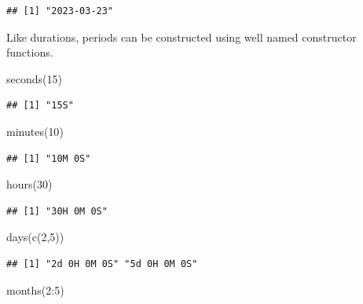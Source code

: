 \documentclass[
]{book}
\newenvironment{Shaded}{\begin{snugshade}}{\end{snugshade}}
\newcommand{\DecValTok}[1]{\textcolor[rgb]{0.00,0.00,0.81}{#1}}
\newcommand{\FunctionTok}[1]{\textcolor[rgb]{0.00,0.00,0.00}{#1}}
\newcommand{\NormalTok}[1]{#1}
\newcommand{\SpecialCharTok}[1]{\textcolor[rgb]{0.00,0.00,0.00}{#1}}
\begin{document}
\begin{verbatim}
## [1] "2023-03-23"
\end{verbatim}

Like durations, periods can be constructed using well named constructor functions.

\begin{Shaded}
\begin{Highlighting}[]
\FunctionTok{seconds}\NormalTok{(}\DecValTok{15}\NormalTok{)}
\end{Highlighting}
\end{Shaded}

\begin{verbatim}
## [1] "15S"
\end{verbatim}

\begin{Shaded}
\begin{Highlighting}[]
\FunctionTok{minutes}\NormalTok{(}\DecValTok{10}\NormalTok{)}
\end{Highlighting}
\end{Shaded}

\begin{verbatim}
## [1] "10M 0S"
\end{verbatim}

\begin{Shaded}
\begin{Highlighting}[]
\FunctionTok{hours}\NormalTok{(}\DecValTok{30}\NormalTok{)}
\end{Highlighting}
\end{Shaded}

\begin{verbatim}
## [1] "30H 0M 0S"
\end{verbatim}

\begin{Shaded}
\begin{Highlighting}[]
\FunctionTok{days}\NormalTok{(}\FunctionTok{c}\NormalTok{(}\DecValTok{2}\NormalTok{,}\DecValTok{5}\NormalTok{))}
\end{Highlighting}
\end{Shaded}

\begin{verbatim}
## [1] "2d 0H 0M 0S" "5d 0H 0M 0S"
\end{verbatim}

\begin{Shaded}
\begin{Highlighting}[]
\FunctionTok{months}\NormalTok{(}\DecValTok{2}\SpecialCharTok{:}\DecValTok{5}\NormalTok{)}
\end{Highlighting}
\end{Shaded}
\end{document}
